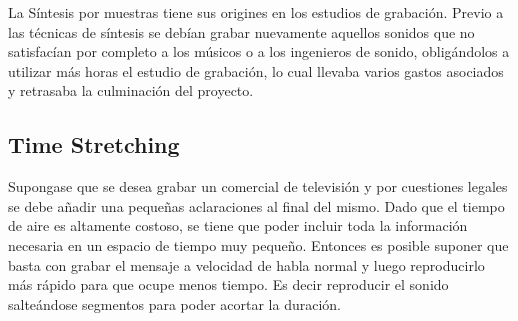 La Síntesis por muestras tiene sus origines en los estudios de grabación. Previo a las técnicas de síntesis se debían grabar nuevamente aquellos sonidos que no satisfacían por completo a los músicos o a los ingenieros de sonido, obligándolos a utilizar más horas el estudio de grabación, lo cual llevaba varios gastos asociados y retrasaba la culminación del proyecto.

\subsection{Time Stretching}
Supongase que se desea grabar un comercial de televisión y por cuestiones legales se debe añadir una pequeñas aclaraciones al final del mismo. Dado que el tiempo de aire es altamente costoso, se tiene que poder incluir toda la información necesaria en un espacio de tiempo muy pequeño. Entonces es posible suponer que basta con grabar el mensaje a velocidad de habla normal y luego reproducirlo más rápido para que ocupe menos tiempo. Es decir reproducir el sonido salteándose segmentos para poder acortar la duración.
